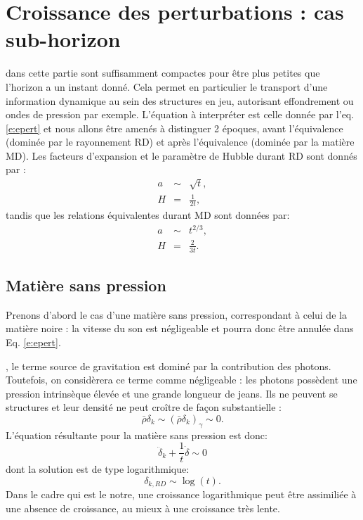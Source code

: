  \section{Croissance des perturbations : cas sub-horizon}
  dans cette partie sont suffisamment compactes pour être plus petites que l'horizon a un instant donné. Cela permet en particulier le transport d'une information dynamique au sein des structures en jeu, autorisant effondrement ou ondes de pression par exemple. L'équation à interpréter est celle donnée par l'eq. \ref{e:epert} et nous allons être amenés à distinguer 2 époques, avant l'équivalence (dominée par le rayonnement RD) et après l'équivalence (dominée par la matière MD). Les facteurs d'expansion et le paramètre de Hubble  durant RD sont donnés par :
 \begin{eqnarray}
 a&\sim& \sqrt{t},\\
 H&=&\frac{1}{2t},
 \end{eqnarray}
 tandis que les relations équivalentes durant MD sont données par:
 \begin{eqnarray}
 a&\sim&t^{2/3},\\
 H&=&\frac{2}{3t}.
 \end{eqnarray}
 
  \subsection{Matière sans pression}
Prenons d'abord le cas d'une matière sans pression, correspondant à celui de la matière noire : la vitesse du son est négligeable et pourra donc être annulée dans Eq. \ref{e:epert}.

, le terme source de gravitation est dominé par la contribution des photons. Toutefois, on considèrera ce terme comme négligeable : les photons possèdent une pression intrinsèque élevée et une grande longueur de jeans. Ils ne peuvent se structures et leur densité ne peut croître de façon substantielle :
\begin{equation}
\bar \rho \delta_k \sim(\bar \rho \delta_k)_\gamma \sim 0.
\end{equation}
L'équation résultante pour la matière sans pression est donc: 
\begin{equation}
\ddot \delta_k+\frac{1}{t}\dot \delta \sim 0
\end{equation}
dont la solution est de type logarithmique:
\begin{equation}
\delta_{k,RD}\sim \log(t).
\end{equation}
Dans le cadre qui est le notre, une croissance logarithmique peut être assimiliée à une absence de croissance, au mieux à une croissance très lente.

